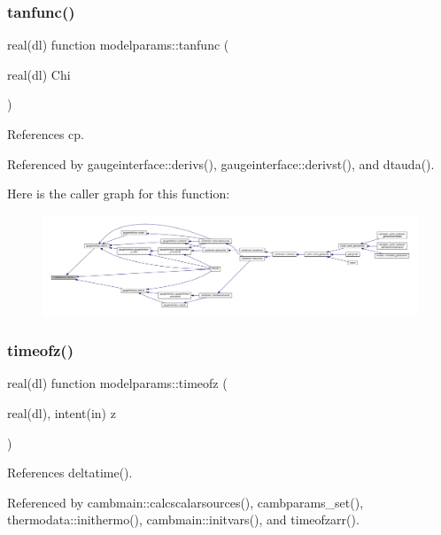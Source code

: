 \subsubsection{\texorpdfstring{tanfunc()}{tanfunc()}}
{\footnotesize\ttfamily real(dl) function modelparams\+::tanfunc (\begin{DoxyParamCaption}\item[{real(dl)}]{Chi }\end{DoxyParamCaption})}



References cp.



Referenced by gaugeinterface\+::derivs(), gaugeinterface\+::derivst(), and dtauda().

Here is the caller graph for this function\+:
\nopagebreak
\begin{figure}[H]
\begin{center}
\leavevmode
\includegraphics[width=350pt]{namespacemodelparams_ade19d5a5ee3bef508e781d64c8c667ae_icgraph}
\end{center}
\end{figure}
\mbox{\label{namespacemodelparams_ae8f7910867e2ed755e7f4d5eacdeee2d}} 
\subsubsection{\texorpdfstring{timeofz()}{timeofz()}}
{\footnotesize\ttfamily real(dl) function modelparams\+::timeofz (\begin{DoxyParamCaption}\item[{real(dl), intent(in)}]{z }\end{DoxyParamCaption})}



References deltatime().



Referenced by cambmain\+::calcscalarsources(), cambparams\+\_\+set(), thermodata\+::inithermo(), cambmain\+::initvars(), and timeofzarr().

